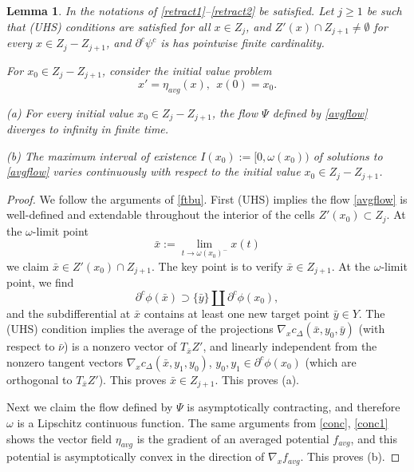 \documentclass[12pt]{amsart}
\newtheorem{lem}{Lemma}
\theoremstyle{definition}
\theoremstyle{remark}
\newcommand{\del}{\partial}
\newcommand{\cd}{c_\Delta}
\begin{document}
\begin{lem}\label{L;ft}
In the notations of \ref{retract1}--\ref{retract2} be satisfied. Let $j\geq 1$ be such that (UHS) conditions are satisfied for all $x\in Z_j$, and $Z'(x)\cap Z_{j+1}\neq \emptyset$ for every $x\in Z_j - Z_{j+1}$, and $\del^c\psi^c$ is has pointwise finite cardinality. 

For $x_0 \in Z_j - Z_{j+1}$, consider the initial value problem \begin{equation}\label{avgflow}
x'=\eta_{avg}(x), ~~x(0)=x_0.
\end{equation}

(a) For every initial value $x_0\in Z_j - Z_{j+1}$, the flow $\Psi$ defined by \eqref{avgflow} diverges to infinity in finite time.

(b) The maximum interval of existence $I(x_0):=[0, \omega(x_0))$ of solutions to \eqref{avgflow} varies continuously with respect to the initial value $x_0\in Z_j-Z_{j+1}$.
\end{lem}

\begin{proof}
We follow the arguments of \ref{ftbu}. First (UHS) implies the flow \eqref{avgflow} is well-defined and extendable throughout the interior of the cells $Z'(x_0)\subset Z_j$. At the $\omega$-limit point $$\bar{x}:=\lim_{t\to \omega(x_0)^-} x(t)$$ we claim $\bar{x}\in Z'(x_0)\cap Z_{j+1}$. The key point is to verify $\bar{x}\in Z_{j+1}$. At the $\omega$-limit point, we find $$\del^c \phi(\bar{x}) \supset \{\bar{y}\} \coprod \del^c \phi(x_0),$$ and the subdifferential at $\bar{x}$ contains at least one new target point $\bar{y} \in Y$. The (UHS) condition implies the average of the projections $\nabla_x \cd(\bar{x}, y_0, \bar{y})$ (with respect to $\bar{\nu}$) is a nonzero vector of $T_{\bar{x}} Z'$, and linearly independent from the nonzero tangent vectors $\nabla_x \cd(\bar{x}, y_1,y_0)$, $y_0, y_1 \in \del^c \phi(x_0)$ (which are orthogonal to $T_{\bar{x}} Z'$). This proves $\bar{x}\in Z_{j+1}$. This proves (a). 

Next we claim the flow defined by $\Psi$ is asymptotically contracting, and therefore $\omega$ is a Lipschitz continuous function. The same arguments from \ref{conc}, \ref{conc1} shows the vector field $\eta_{avg}$ is the gradient of an averaged potential $f_{avg}$, and this potential is asymptotically convex in the direction of $\nabla_x f_{avg}$. This proves (b).

\end{proof}
\end{document}
